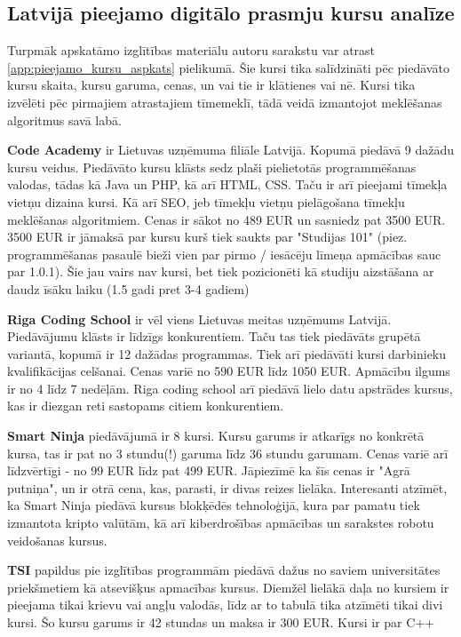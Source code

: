 \subsection{Latvijā pieejamo digitālo prasmju kursu analīze}
Turpmāk apskatāmo izglītības materiālu autoru sarakstu var atrast \ref{app:pieejamo_kursu_aspkats} pielikumā.
Šie kursi tika salīdzināti pēc piedāvāto kursu skaita, kursu garuma, cenas, un vai tie ir klātienes vai nē.
Kursi tika izvēlēti pēc pirmajiem atrastajiem tīmemeklī, tādā veidā izmantojot meklēšanas algoritmus savā labā.
\par
\textbf{Code Academy} ir Lietuvas uzņēmuma filiāle Latvijā. Kopumā piedāvā 9 dažādu kursu veidus. Piedāvāto kursu klāsts
sedz plaši pielietotās programmēšanas valodas, tādas kā Java un PHP, kā arī HTML, CSS. Taču ir arī pieejami
tīmekļa vietņu dizaina kursi. Kā arī SEO, jeb tīmekļu vietņu pielāgošana tīmekļu meklēšanas algoritmiem.
Cenas ir sākot no 489 EUR un sasniedz pat 3500 EUR. 3500 EUR ir jāmaksā par kursu kurš tiek saukts par
"Studijas 101" (piez. programmēšanas pasaulē bieži vien par pirmo / iesācēju līmeņa apmācības sauc par 1.0.1).
Šie jau vairs nav kursi, bet tiek pozicionēti kā studiju aizstāšana ar daudz īsāku laiku (1.5 gadi pret 3-4 gadiem)
\par
\textbf{Riga Coding School} ir vēl viens Lietuvas meitas uzņēmums Latvijā. Piedāvājumu klāsts ir līdzīgs konkurentiem.
Taču tas tiek piedāvāts grupētā variantā, kopumā ir 12 dažādas programmas. Tiek arī piedāvāti kursi darbinieku 
kvalifikācijas celšanai. Cenas variē no 590 EUR līdz 1050 EUR. Apmācību ilgums ir no 4 līdz 7 nedēļām. Riga coding
school arī piedāvā lielo datu apstrādes kursus, kas ir diezgan reti sastopams citiem konkurentiem.
\par
\textbf{Smart Ninja} piedāvājumā ir 8 kursi. Kursu garums ir atkarīgs no konkrētā kursa, tas ir pat no 3 stundu(!)
garuma līdz 36 stundu garumam. Cenas variē arī līdzvērtīgi - no 99 EUR līdz pat 499 EUR. Jāpiezīmē ka šīs cenas
ir "Agrā putniņa", un ir otrā cena, kas, parasti, ir divas reizes lielāka.  Interesanti atzīmēt, ka
Smart Ninja piedāvā kursus blokķēdēs tehnoloģijā, kura par pamatu tiek izmantota kripto valūtām, kā arī
kiberdrošības apmācības un sarakstes robotu veidošanas kursus.
\par
\textbf{TSI} papildus pie izglītības programmām piedāvā dažus no saviem universitātes priekšmetiem kā atsevišķus
apmacības kursus. Diemžēl lielākā daļa no kursiem ir pieejama tikai krievu vai angļu valodās, līdz ar to
tabulā tika atzīmēti tikai divi kursi. Šo kursu garums ir 42 stundas un maksa ir 300 EUR. Kursi ir par C++ 
